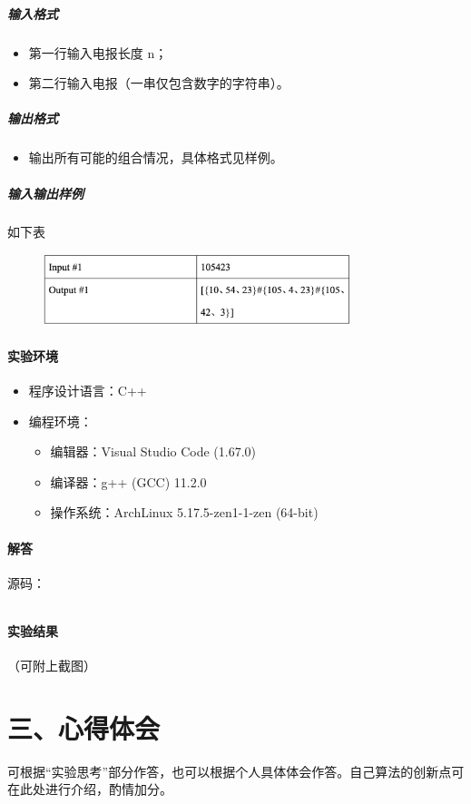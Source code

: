 \documentclass[12pt,a4paper]{ctexart}
\begin{document}
\subparagraph{输入格式}
    \begin{itemize}
        \item 第一行输入电报长度 n；
        \item 第二行输入电报（一串仅包含数字的字符串）。

    \end{itemize}

\subparagraph{输出格式}
    \begin{itemize}
        \item 输出所有可能的组合情况，具体格式见样例。
    \end{itemize}
    

\subparagraph{输入输出样例}
如下表
    \begin{figure}[h]
        \centering
        \includegraphics[width=0.80\textwidth]{q3_iodata.png}
    \end{figure}

\vspace{5pt}

\paragraph{实验环境}
\begin{itemize}
    \item 程序设计语言：C++
    \item 编程环境：
    \begin{itemize}
        \item 编辑器：Visual Studio Code (1.67.0)
        \item 编译器：g++ (GCC) 11.2.0
        \item 操作系统：ArchLinux 5.17.5-zen1-1-zen (64-bit)
    \end{itemize}
\end{itemize}

\vspace{5pt}

\paragraph{解答}

源码：
\inputminted[bgcolor=codebg,frame=lines,autogobble,linenos=true,breaklines]{cpp}{src/c.cpp}

\vspace{5pt}

\paragraph{实验结果}
（可附上截图）

\newpage

\section*{三、心得体会}
    可根据“实验思考”部分作答，也可以根据个人具体体会作答。自己算法的创新点可在此处进行介绍，酌情加分。
\end{document}
